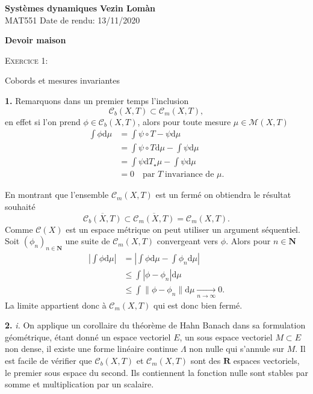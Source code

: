 \documentclass[12pt]{article}
\newenvironment{ex}[1]
{\begin{mdframed}[linewidth=0.6pt]
        \textsc{Exercice #1:}

}
    {\end{mdframed}}
\newcommand{\R}{\mathbf{R}}
\newcommand{\N}{\mathbf{N}}
\newcommand{\de}{\mathrm{d}}
\begin{document}
        \noindent
\textbf{Systèmes dynamiques} \hfill \textbf{Vezin Lomàn}\\
\normalsize MAT551  \hfill Date de rendu: 13/11/2020\\

\begin{center}
\textbf{Devoir maison}
\end{center}

\begin{ex}{1}
        Cobords et mesures invariantes
\end{ex}

\textbf{1.} Remarquons dans un premier temps l'inclusion
\[
        \mathcal{C}_{b}(X,T) \subset \mathcal{C}_{m}(X,T)
,\] en effet si l'on prend $\phi \in \mathcal{C}_{b}(X,T)$, alors pour toute mesure $\mu \in \mathcal{M}(X,T)$ 
\begin{align*}
        \int\phi\de\mu &= \int\psi\circ T - \psi\de\mu \\
                       &= \int \psi \circ T \de \mu - \int\psi\de\mu \\
                       &= \int\psi \de T_{\star}\mu - \int\psi\de\mu \\ 
                       &= 0 \quad \text{par } T \; \text{invariance de } \mu
.\end{align*}

En montrant que l'ensemble $\mathcal{C}_{m}(X,T)$ est un fermé on obtiendra le résultat souhaité \[
        \overline{\mathcal{C}_{b}(X,T)} \subset \overline{\mathcal{C}_{m}(X,T)} = \mathcal{C}_{m}(X,T)
.\] 
Comme $\mathcal{C}(X)$ est un espace métrique on peut utiliser un argument séquentiel. Soit $(\phi_{n})_{n\in\N}$ une suite de $\mathcal{C}_{m}(X,T)$ convergeant vers $\phi$. Alors pour $n \in \N$
\begin{align*}
        |\int\phi\de\mu| &= |\int\phi\de\mu - \int\phi_{n}\de\mu| \\
                         &\le \int|\phi-\phi_{n}|\de\mu \\
                         &\le\int\|\phi-\phi_{n}\|\de\mu \underset{n\to \infty}{\longrightarrow} 0
.\end{align*}
La limite appartient donc à $\mathcal{C}_{m}(X,T)$ qui est donc bien fermé.

\textbf{2.} \textit{i.} On applique un corollaire du théorème de Hahn Banach dans sa formulation géométrique, étant donné un espace vectoriel $E$, un sous espace vectoriel $M \subset E$ non dense, il existe une forme linéaire continue $\Lambda$ non nulle qui s'annule sur $M$. Il est facile de vérifier que $\mathcal{C}_{b}(X,T)$ et $\mathcal{C}_{m}(X,T)$ sont des $\R$ espaces vectoriels, le premier sous espace du second. Ils contiennent la fonction nulle sont stables par somme et multiplication par un scalaire. 
\end{document}
